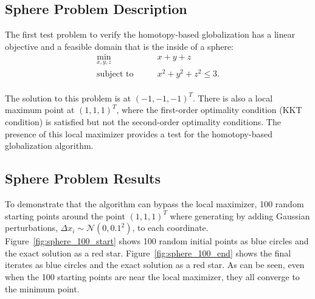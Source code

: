 \subsection{Sphere Problem Description}
The first test problem to verify the homotopy-based globalization 
 has a linear objective and a feasible domain that is the inside of a sphere:
\begin{equation*}
\begin{aligned}
\underset{x, y, z} {\text{min}}  & \quad \quad x + y + z \\
   {\text{subject to}}  & \quad \quad x^2 + y^2 + z^2 \leq 3. \\
\end{aligned}
\end{equation*}

The solution to this problem is at $(-1,-1,-1)^T$. There is also a local maximum point at $(1,1,1)^T$, where the 
first-order optimality condition (KKT condition) is  satisfied but not the second-order optimality conditions. 
The presence of this local maximizer provides a test for the homotopy-based globalization algorithm.

\subsection{Sphere Problem Results}
To demonstrate that the algorithm can bypass the local maximizer, 100 random starting points around the point $(1,1,1)^T$ where generating by adding Gaussian perturbations, $\Delta x_i \sim \mathcal{N}(0,0.1^2)$, to each coordinate. Figure~\ref{fig:sphere_100_start} shows 100 random initial points as blue circles and the exact solution as a red star. Figure~\ref{fig:sphere_100_end} shows the final iterates as blue circles and the exact solution as a red star. As can be seen, even when the 100 starting points are near the local maximizer, they all converge to the minimum point.  

